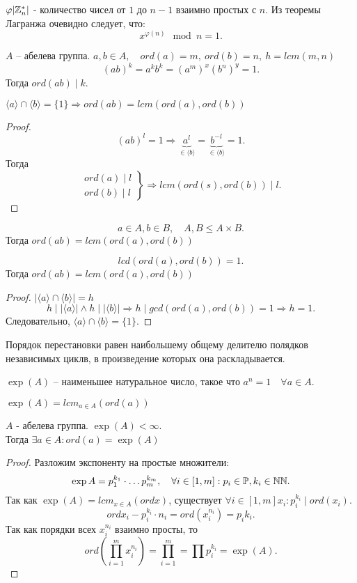 \documentclass[12pt]{report}
\begin{document}
$\varphi |\mathbb{Z}_n^*|$ - количество чисел от $1$ до $n-1$ взаимно простых с $n$.
Из теоремы Лагранжа очевидно следует, что:
\[
    x^{\varphi(n)} \mod n= 1
.\] 
\begin{st}
    $A$ -- абелева группа.
    $a, b \in  A, \quad ord(a) = m, ~ord(b) = n, ~h= lcm(m, n)$
    \[
	(ab)^k = a^k b^k = (a^m)^x (b^n)^y = 1
    .\] 
    Тогда $ord(ab) \mid k$.
\end{st}
\begin{lm}
    $\langle a \rangle \cap \langle b \rangle =\{1\} \Rightarrow ord(ab) = lcm(ord (a) , ord(b))$
\end{lm}
\begin{proof}
    \[
	(ab)^l = 1 \Rightarrow \underbrace{a^l}_{\in \langle b \rangle}  = \underbrace{b^{-l}}_{\in \langle b \rangle } = 1
    .\] 
    Тогда \[
    \left . 
    \begin{array}{ll}
	ord(a) \mid l \\
	ord(b) \mid l
    \end{array}
\right \} \Rightarrow  lcm(ord(s), ord(b)) \mid l
    .\] 
\end{proof}
\begin{cor}
    \[
    a \in  A, b \in  B, \quad  A,B \le A\times B 
    .\] 
    Тогда $ord(ab) = lcm(ord(a), ord(b))$
\end{cor}
\begin{cor}
    \[
	lcd(ord(a) ,ord(b)) = 1 
    .\] 
    Тогда $ord(ab) = lcm(ord(a), ord(b))$
\end{cor}
\begin{proof}
    $ | \langle a \rangle \cap \langle b \rangle | = h$
    \[
	h \mid |\langle a \rangle| \wedge h \mid |\langle b \rangle| \Rightarrow h \mid gcd(ord(a), ord(b)) = 1 \Rightarrow  h =1
    .\] 
    Следовательно, $\langle a \rangle \cap \langle b \rangle =\{1\}$.
\end{proof}
\begin{cor}
    Порядок перестановки равен наибольшему общему делителю полядков независимых циклв, в произведение которых она раскладывается.
\end{cor}
\begin{defn}
    $\exp(A)$ -- наименьшее натуральное число, такое что $a^n = 1 \quad \forall a \in  A$.
\end{defn}
\begin{lm}
    $\exp(A) = lcm_{a \in A} (ord(a))$
\end{lm}
\begin{thm}
    $A$ - абелева группа. $\exp(A) < \infty$.\\
    Тогда  $\exists a \in  A: ord(a) = \exp(A)$
\end{thm}
\begin{proof}
    Разложим экспоненту на простые множители: 
    \[
	\exp A = p_1^{k_1} \cdot \ldots p_m^{k_m}, \quad \forall i \in [1, m] : p_i \in  \mathbb{P}, k_i \in  \mathbb{N} \mathbb{N}
    .\] 
    Так как $\exp(A) = lcm_{x \in  A}(ord x)$, существует $\forall i \in [1, m] x_i : p_i^{k_i} \mid ord(x_i) $.
    \[
	ord x_i - p_i^{k_i} \cdot n_i = ord(x_i^{n_i}) = p_i{k_i}
    .\] 
    Так как порядки всех $x_i^{n_i}$ взаимно просты, то \[
	ord(\prod\limits_{i=1}^{m} x_i^{n_i}) = \prod\limits_{i=1}^m = \prod p_i^{k_i} = \exp(A)
    .\]  
\end{proof}
\end{document}
